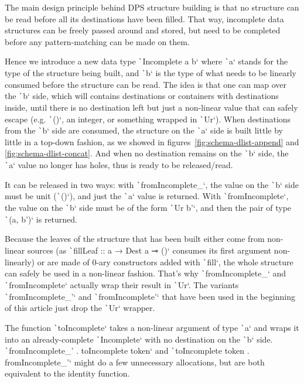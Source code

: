 \documentclass[english]{jflart}
\begin{document}
The main design principle behind DPS structure building is that no structure can be read before all its destinations have been filled. That way, incomplete data structures can be freely passed around and stored, but need to be completed before any pattern-matching can be made on them.

Hence we introduce a new data type \texttt`Incomplete a b` where \texttt`a` stands for the type of the structure being built, and \texttt`b` is the type of what needs to be linearly consumed before the structure can be read. The idea is that one can map over the \texttt`b` side, which will contains destinations or containers with destinations inside, until there is no destination left but just a non-linear value that can safely escape (e.g. \texttt`()`, an integer, or something wrapped in \texttt`Ur`). When destinations from the \texttt`b` side are consumed, the structure on the \texttt`a` side is built little by little in a top-down fashion, as we showed in figures~\ref{fig:schema-dlist-append} and \ref{fig:schema-dlist-concat}. And when no destination remains on the \texttt`b` side, the \texttt`a` value no longer has holes, thus is ready to be released/read.

It can be released in two ways: with \texttt`fromIncomplete_`, the value on the \texttt`b` side must be unit (\texttt`()`), and just the \texttt`a` value is returned. With \texttt`fromIncomplete`, the value on the \texttt`b` side must be of the form  \texttt`Ur b'`, and then the pair of type \texttt`(a, b')` is returned.

Because the leaves of the structure that has been built either come from non-linear sources (as \texttt`fillLeaf :: a → Dest a ⊸ ()` consumes its first argument non-linearly) or are made of 0-ary constructors added with \texttt`fill`, the whole structure can safely be used in a non-linear fashion. That's why \texttt`fromIncomplete_` and \texttt`fromIncomplete` actually wrap their result in \texttt`Ur`. The variants \texttt`fromIncomplete_'` and \texttt`fromIncomplete'` that have been used in the beginning of this article just drop the \texttt`Ur` wrapper.

The function \texttt`toIncomplete` takes a non-linear argument of type \texttt`a` and wraps it into an already-complete \texttt`Incomplete` with no destination on the \texttt`b` side. \texttt`fromIncomplete_' . toIncomplete token` and \texttt`toIncomplete token . fromIncomplete_'` might do a few unnecessary allocations, but are both equivalent to the identity function.
\end{document}
